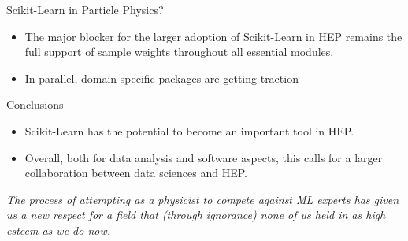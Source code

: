 \documentclass{beamer}
\begin{document}
\begin{frame}{Scikit-Learn in Particle Physics?}

\begin{itemize}
\item The major blocker for the larger adoption of Scikit-Learn in HEP remains the {\color{red} full support of sample weights} throughout
      all essential modules.


      \vspace{0.5cm}

\item In parallel, domain-specific packages are getting traction


\end{itemize}

\end{frame}


\begin{frame}{Conclusions}

\begin{itemize}

\vspace{0.5cm}

\item Scikit-Learn has the potential to become an important tool in HEP.

\vspace{0.5cm}

\item Overall, both for data analysis and software aspects, this calls
  for a {\color{blue} larger collaboration between data sciences and HEP}.
\end{itemize}

\vspace{0.25cm}

\begin{center}
\it The process of attempting as a physicist to compete against ML experts
has given us a new respect for a field that (through ignorance) none of us held in as high esteem as we do now.
\end{center}

\end{frame}
\end{document}
